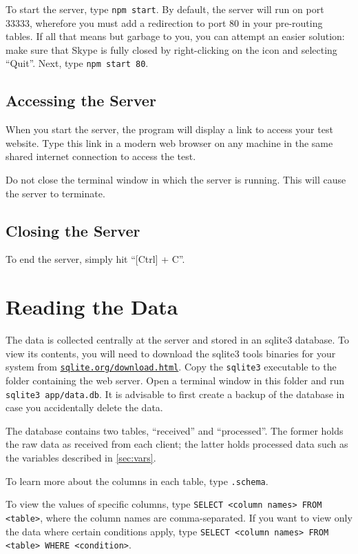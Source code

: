 \documentclass[a4paper,11pt,british,oneside]{article}
\begin{document}
To start the server, type \texttt{npm start}. By default, the server will run on port 33333, wherefore you must add a redirection to port 80 in your pre-routing tables. If all that means but garbage to you, you can attempt an easier solution: make sure that Skype is fully closed by right-clicking on the icon and selecting \enquote{Quit}. Next, type \texttt{npm start 80}.

\subsection{Accessing the Server}

When you start the server, the program will display a link to access your test website. Type this link in a modern web browser on any machine in the same shared internet connection to access the test.

Do not close the terminal window in which the server is running. This will cause the server to terminate.

\subsection{Closing the Server}

To end the server, simply hit \enquote{[Ctrl] + C}.


\section{Reading the Data}

The data is collected centrally at the server and stored in an sqlite3 database. To view its contents, you will need to download the sqlite3 tools binaries for your system from \href{https://www.sqlite.org/download.html}{\nolinkurl{sqlite.org/download.html}}. Copy the \texttt{sqlite3} executable to the folder containing the web server. Open a terminal window in this folder and run \verb|sqlite3 app/data.db|. It is advisable to first create a backup of the database in case you accidentally delete the data.

The database contains two tables, \enquote{received} and \enquote{processed}. The former holds the raw data as received from each client; the latter holds processed data such as the variables described in \autoref{sec:vars}.

To learn more about the columns in each table, type \texttt{.schema}.

To view the values of specific columns, type \texttt{SELECT <column names> FROM <table>}, where the column names are comma-separated. If you want to view only the data where certain conditions apply, type \texttt{SELECT <column names> FROM <table> WHERE <condition>}.
\end{document}
